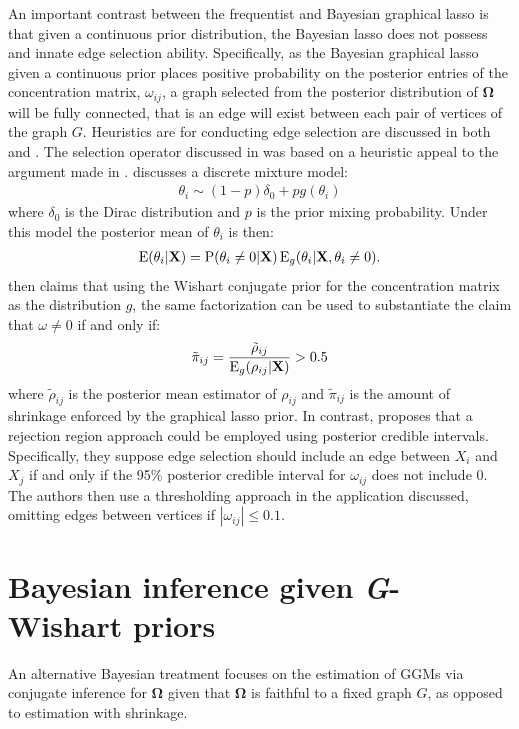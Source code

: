 \begin{DoubleSpace*}
An important contrast between the frequentist and Bayesian graphical lasso is that given a continuous prior distribution, the Bayesian lasso does not possess and innate edge selection ability. Specifically, as the Bayesian graphical lasso given a continuous prior places positive probability on the posterior entries of the concentration matrix, $\omega_{ij}$, a graph selected from the posterior distribution of $\boldsymbol{\Omega}$ will be fully connected, that is an edge will exist between each pair of vertices of the graph $G$. Heuristics are for conducting edge selection are discussed in both \cite{wang2012}  and \cite{peterson2013}. The selection operator discussed in \cite{wang2012} was based on a heuristic appeal to the argument made in \cite{carvalho2010}.  \cite{carvalho2010} discusses a discrete mixture model:
\begin{align}
\theta_i \sim (1-p)\delta_0 + pg(\theta_i)
\end{align}
where $\delta_0$ is the Dirac distribution and $p$ is the prior mixing probability. Under this model the posterior mean of $\theta_i$ is then:
\begin{align}
\operatorname{E}(\theta_i|\textbf{X})=\operatorname{P}(\theta_i\neq 0|\textbf{X})\operatorname{E}_g(\theta_i|\textbf{X},\theta_i\neq 0).
\end{align}
\cite{wang2012} then claims that using the Wishart conjugate prior for the concentration matrix as the distribution $g$, the same factorization can be used to substantiate the claim that $\omega \neq 0$ if and only if:
\begin{align}
\tilde{\pi}_{ij}=\frac{\tilde{\rho}_{ij}}{\operatorname{E}_g(\rho_{ij}|\textbf{X})}>0.5
\end{align}
where $\tilde{\rho}_{ij}$ is the posterior mean estimator of $\rho_{ij}$ and $\tilde{\pi}_{ij}$ is the amount of shrinkage enforced by the graphical lasso prior. In contrast, \cite{peterson2013} proposes that a rejection region approach could be employed using posterior credible intervals. Specifically, they suppose edge selection should include an edge between $X_i$ and $X_j$ if and only if the 95\% posterior credible interval for $\omega_{ij}$ does not include 0. The authors then use a thresholding approach in the application discussed, omitting edges between vertices if $|\omega_{ij}|\leq 0.1$.

\section{Bayesian inference given \emph{G}-Wishart priors}
An alternative Bayesian treatment focuses on  \cite{dawid1993,roverato2002,atay2005,dobra2011a,dobra2011b,wang2012,cheng2012} the estimation of GGMs via conjugate inference for $\boldsymbol{\Omega}$ given that $\boldsymbol{\Omega}$ is faithful to a fixed graph $G$, as opposed to estimation with shrinkage.


\end{DoubleSpace*}
